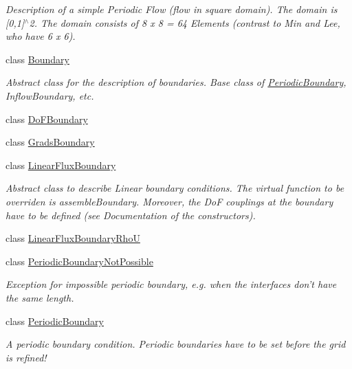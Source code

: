 \begin{DoxyCompactItemize}
\begin{DoxyCompactList}\small\item\em Description of a simple Periodic Flow (flow in square domain). The domain is \mbox{[}0,1\mbox{]}$^\wedge$2. The domain consists of 8 x 8 = 64 Elements (contrast to Min and Lee, who have 6 x 6). \item\end{DoxyCompactList}\item 
class \hyperlink{classnatrium_1_1Boundary}{Boundary}
\begin{DoxyCompactList}\small\item\em Abstract class for the description of boundaries. Base class of \hyperlink{classnatrium_1_1PeriodicBoundary}{PeriodicBoundary}, InflowBoundary, etc. \item\end{DoxyCompactList}\item 
class \hyperlink{classnatrium_1_1DoFBoundary}{DoFBoundary}
\item 
class \hyperlink{classnatrium_1_1GradsBoundary}{GradsBoundary}
\item 
class \hyperlink{classnatrium_1_1LinearFluxBoundary}{LinearFluxBoundary}
\begin{DoxyCompactList}\small\item\em Abstract class to describe Linear boundary conditions. The virtual function to be overriden is assembleBoundary. Moreover, the DoF couplings at the boundary have to be defined (see Documentation of the constructors). \item\end{DoxyCompactList}\item 
class \hyperlink{classnatrium_1_1LinearFluxBoundaryRhoU}{LinearFluxBoundaryRhoU}
\item 
class \hyperlink{classnatrium_1_1PeriodicBoundaryNotPossible}{PeriodicBoundaryNotPossible}
\begin{DoxyCompactList}\small\item\em Exception for impossible periodic boundary, e.g. when the interfaces don't have the same length. \item\end{DoxyCompactList}\item 
class \hyperlink{classnatrium_1_1PeriodicBoundary}{PeriodicBoundary}
\begin{DoxyCompactList}\small\item\em A periodic boundary condition. Periodic boundaries have to be set before the grid is refined! \item\end{DoxyCompactList}\item 

\end{DoxyCompactItemize}
